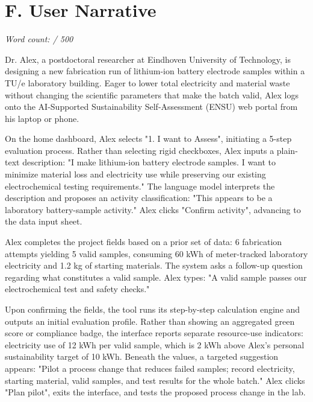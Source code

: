 \documentclass[11pt,a4paper]{article}
\begin{document}
\clearpage
\section*{F. User Narrative}
\noindent\textit{Word count: \Fwordcount / 500}\par\medskip

\noindent Dr. Alex, a postdoctoral researcher at Eindhoven University of Technology, is designing a new fabrication run of lithium-ion battery electrode samples within a TU/e laboratory building. Eager to lower total electricity and material waste without changing the scientific parameters that make the batch valid, Alex logs onto the AI-Supported Sustainability Self-Assessment (ENSU) web portal from his laptop or phone.

On the home dashboard, Alex selects "1. I want to Assess", initiating a 5-step evaluation process. Rather than selecting rigid checkboxes, Alex inputs a plain-text description: "I make lithium-ion battery electrode samples. I want to minimize material loss and electricity use while preserving our existing electrochemical testing requirements." The language model interprets the description and proposes an activity classification: "This appears to be a laboratory battery-sample activity." Alex clicks "Confirm activity", advancing to the data input sheet.

Alex completes the project fields based on a prior set of data: 6 fabrication attempts yielding 5 valid samples, consuming 60 kWh of meter-tracked laboratory electricity and 1.2 kg of starting materials. The system asks a follow-up question regarding what constitutes a valid sample. Alex types: "A valid sample passes our electrochemical test and safety checks."

Upon confirming the fields, the tool runs its step-by-step calculation engine and outputs an initial evaluation profile. Rather than showing an aggregated green score or compliance badge, the interface reports separate resource-use indicators: electricity use of 12 kWh per valid sample, which is 2 kWh above Alex's personal sustainability target of 10 kWh. Beneath the values, a targeted suggestion appears: "Pilot a process change that reduces failed samples; record electricity, starting material, valid samples, and test results for the whole batch." Alex clicks "Plan pilot", exits the interface, and tests the proposed process change in the lab.
\end{document}
